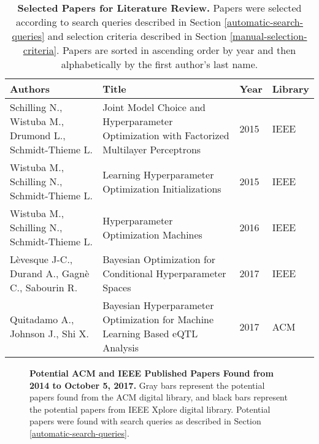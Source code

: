 \begin{table}
\centering
\caption{\textbf{Selected Papers for Literature Review.} Papers were selected according to search queries described in Section \ref{automatic-search-queries} and selection criteria described in Section \ref{manual-selection-criteria}. Papers are sorted in ascending order by year and then alphabetically by the first author's last name.}
\label{table:papers_selected}
\begin{tabular}{p{1in}p{1.25in}p{0.2in}p{0.3in}}
	\toprule
	\textbf{Authors} & \textbf{Title} & \textbf{Year} & \textbf{Library} \\
	\midrule \addlinespace
	Schilling N., Wistuba M., Drumond L., Schmidt-Thieme L. \cite{Schilling:2015} & Joint Model Choice and Hyperparameter Optimization with Factorized Multilayer Perceptrons & 2015 & IEEE
	\addlinespace\\ 
	\midrule \addlinespace
	Wistuba M., Schilling N., Schmidt-Thieme L. \cite{Wistuba:2015} & Learning Hyperparameter Optimization Initializations & 2015 & IEEE
	\addlinespace \\
	\midrule \addlinespace
	Wistuba M., Schilling N., Schmidt-Thieme L. \cite{Wistuba:2016} & Hyperparameter Optimization Machines & 2016 & IEEE 
	\addlinespace \\
	\midrule \addlinespace
	L\`evesque J-C., Durand A., Gagn\`e C., Sabourin R. \cite{Levesque:2017}& Bayesian Optimization for Conditional Hyperparameter Spaces & 2017 & IEEE
	\addlinespace \\ 
	\midrule \addlinespace
	Quitadamo A., Johnson J., Shi X. \cite{Quitadamo:2017}& Bayesian Hyperparameter Optimization for Machine Learning Based eQTL Analysis & 2017 & ACM 
	\addlinespace \\
	\bottomrule
\end{tabular}
\end{table}

\begin{figure}
\begin{center}
\caption{\textbf{Potential ACM and IEEE Published Papers Found from 2014 to October 5, 2017.} Gray bars represent the potential papers found from the ACM digital library, and black bars represent the potential papers from IEEE Xplore digital library. Potential papers were found with search queries as described in Section \ref{automatic-search-queries}.}
\label{figure:papers_library}
\end{center}
\end{figure}

